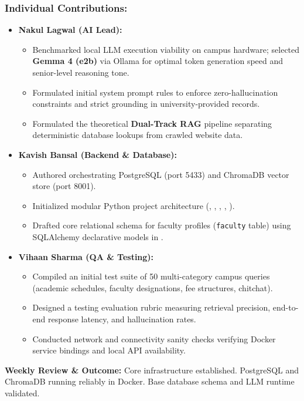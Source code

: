 \documentclass[11pt,a4paper]{article}
\begin{document}
\subsubsection*{Individual Contributions:}
\begin{itemize}
    \setlength{\itemsep}{1pt}
    \item \textbf{Nakul Lagwal (AI Lead):}
    \begin{itemize}
        \setlength{\itemsep}{0pt}
        \item Benchmarked local LLM execution viability on campus hardware; selected \textbf{Gemma 4 (e2b)} via Ollama for optimal token generation speed and senior-level reasoning tone.
        \item Formulated initial system prompt rules to enforce zero-hallucination constraints and strict grounding in university-provided records.
        \item Formulated the theoretical \textbf{Dual-Track RAG} pipeline separating deterministic database lookups from crawled website data.
    \end{itemize}

    \item \textbf{Kavish Bansal (Backend \& Database):}
    \begin{itemize}
        \setlength{\itemsep}{0pt}
        \item Authored  orchestrating PostgreSQL (port 5433) and ChromaDB vector store (port 8001).
        \item Initialized modular Python project architecture (, , , , ).
        \item Drafted core relational schema for faculty profiles (\texttt{faculty} table) using SQLAlchemy declarative models in .
    \end{itemize}

    \item \textbf{Vihaan Sharma (QA \& Testing):}
    \begin{itemize}
        \setlength{\itemsep}{0pt}
        \item Compiled an initial test suite of 50 multi-category campus queries (academic schedules, faculty designations, fee structures, chitchat).
        \item Designed a testing evaluation rubric measuring retrieval precision, end-to-end response latency, and hallucination rates.
        \item Conducted network and connectivity sanity checks verifying Docker service bindings and local API availability.
    \end{itemize}
\end{itemize}
\noindent \textbf{Weekly Review \& Outcome:} Core infrastructure established. PostgreSQL and ChromaDB running reliably in Docker. Base database schema and LLM runtime validated.
\end{document}
